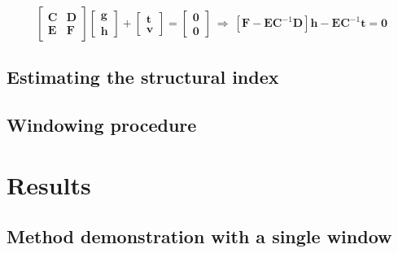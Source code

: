 \begin{equation}
    \begin{bmatrix}
      \mathbf{C} & \mathbf{D} \\
      \mathbf{E} & \mathbf{F}
    \end{bmatrix}
    \begin{bmatrix}
      \mathbf{g} \\
      \mathbf{h}
    \end{bmatrix}
    +
    \begin{bmatrix}
      \mathbf{t}
      \\
      \mathbf{v}
    \end{bmatrix}
    =
    \begin{bmatrix}
      \mathbf{0}
      \\
      \mathbf{0}
    \end{bmatrix}
    \ \Rightarrow \
    \left[\mathbf{F} - \mathbf{E}\mathbf{C}^{-1}\mathbf{D}\right]\mathbf{h}
    - \mathbf{E}\mathbf{C}^{-1}\mathbf{t} = \mathbf{0}
  \label{eq:identity}
\end{equation}


\subsection{Estimating the structural index}

\subsection{Windowing procedure}


\section{Results}


\subsection{Method demonstration with a single window}

